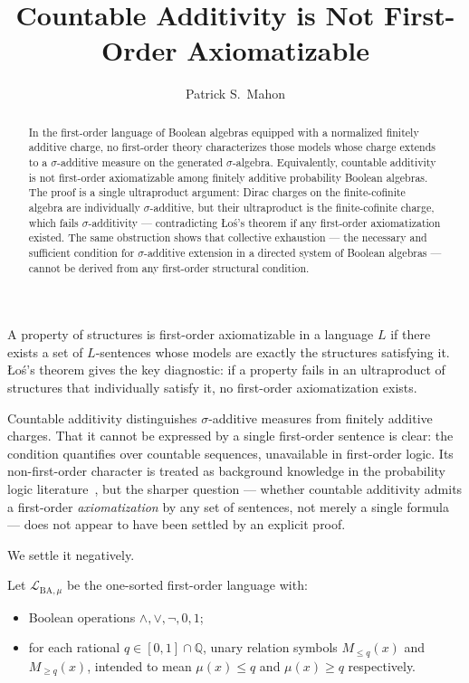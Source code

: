 \documentclass[11pt]{article}
\title{Countable Additivity is Not First-Order Axiomatizable}
\author{Patrick S.\ Mahon}
\date{}
\theoremstyle{definition}
\newcommand{\Lmu}{\mathcal{L}_{\mathrm{BA},\mu}}
\newcommand{\Q}{\mathbb{Q}}
\begin{document}
\maketitle

\begin{abstract}
In the first-order language of Boolean algebras equipped with a normalized finitely
additive charge, no first-order theory characterizes those models whose charge extends
to a $\sigma$-additive measure on the generated $\sigma$-algebra.  Equivalently,
countable additivity is not first-order axiomatizable among finitely additive probability
Boolean algebras.  The proof is a single ultraproduct argument: Dirac charges on the
finite-cofinite algebra are individually $\sigma$-additive, but their ultraproduct is
the finite-cofinite charge, which fails $\sigma$-additivity --- contradicting
\L{}o\'{s}'s theorem if any first-order axiomatization existed.  The same obstruction
shows that collective exhaustion --- the necessary and sufficient condition for
$\sigma$-additive extension in a directed system of Boolean algebras --- cannot be
derived from any first-order structural condition.
\end{abstract}

A property of structures is first-order axiomatizable in a language $L$ if there exists
a set of $L$-sentences whose models are exactly the structures satisfying it.
\L{}o\'{s}'s theorem gives the key diagnostic: if a property fails in an ultraproduct
of structures that individually satisfy it, no first-order axiomatization exists.

Countable additivity distinguishes $\sigma$-additive measures from finitely additive
charges.  That it cannot be expressed by a single first-order sentence is clear: the
condition quantifies over countable sequences, unavailable in first-order logic.  Its
non-first-order character is treated as background knowledge in the probability logic
literature~\cite{Hoover1978,Keisler1985,FaginHalpernMegiddo1990}, but the sharper
question --- whether countable additivity admits a first-order \emph{axiomatization}
by any set of sentences, not merely a single formula --- does not appear to have been
settled by an explicit proof.

We settle it negatively.

\medskip

Let $\Lmu$ be the one-sorted first-order language with:
\begin{itemize}
  \item Boolean operations $\wedge, \vee, \neg, 0, 1$;
  \item for each rational $q \in [0,1] \cap \Q$, unary relation symbols
        $M_{\leq q}(x)$ and $M_{\geq q}(x)$, intended to mean
        $\mu(x) \leq q$ and $\mu(x) \geq q$ respectively.
\end{itemize}
\end{document}
